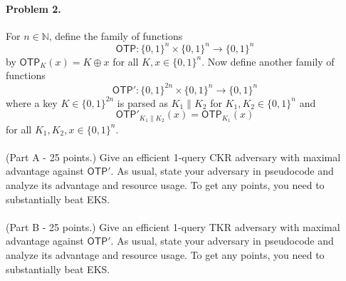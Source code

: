 \documentclass[11pt]{article}
\newcommand{\bits}{\{0,1\}}
\newcommand{\N}{\mathbb{N}}
\begin{document}
 \paragraph*{Problem 2.} 

For $n \in \N$, define the family of functions  $$\mathsf{OTP} \colon \bits^n\times\bits^n\to\bits^n$$ by $\mathsf{OTP}_K(x)= K\oplus x$ for all $K,x\in \bits^n$.
Now define another family of functions $$\mathsf{OTP}':\bits^{2n}\times\bits^n\to\bits^n$$ where a key $K \in \bits^{2n}$ is parsed as $K_1 \| K_2$ for $K_1,K_2 \in \bits^n$ and 
$$\mathsf{OTP}'_{K_1\|K_2}(x) = \mathsf{OTP}_{K_1}(x)$$ for all $K_1,K_2,x \in \bits^n$. \\\\
(Part A - 25 points.) Give an efficient 1-query CKR adversary with maximal advantage against $\mathsf{OTP}'$. As usual, state your adversary in  pseudocode and  analyze its advantage and resource usage. To get any points, you need to substantially beat EKS. \\\\
(Part B - 25 points.) Give an efficient 1-query TKR adversary with maximal advantage against $\mathsf{OTP}'$. As usual, state your adversary in  pseudocode and  analyze its advantage and resource usage. To get any points, you need to substantially beat EKS.
\end{document}

